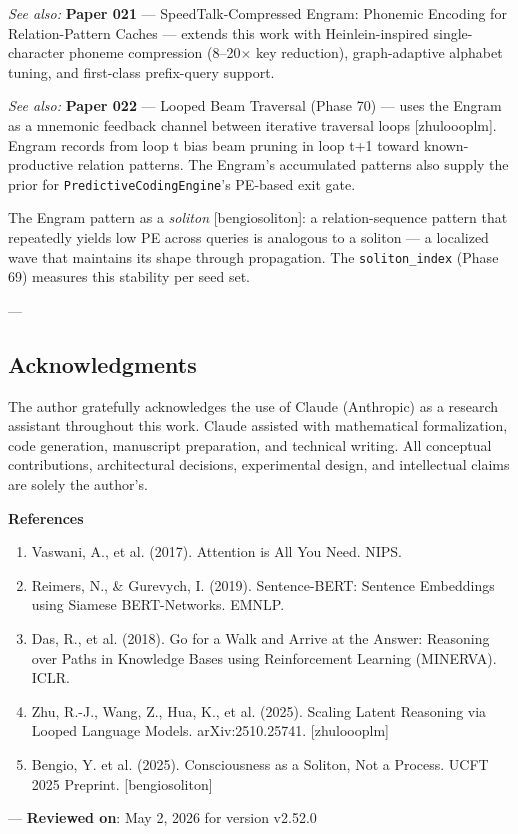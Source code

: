 \textit{See also:} \textbf{Paper 021} — SpeedTalk-Compressed Engram: Phonemic Encoding for Relation-Pattern Caches — extends this work with Heinlein-inspired single-character phoneme compression (8–20$\times$ key reduction), graph-adaptive alphabet tuning, and first-class prefix-query support.

\textit{See also:} \textbf{Paper 022} — Looped Beam Traversal (Phase 70) — uses the Engram as a mnemonic feedback channel between iterative traversal loops [zhu\-loooplm]. Engram records from loop t bias beam pruning in loop t+1 toward known-productive relation patterns. The Engram's accumulated patterns also supply the prior for \texttt{PredictiveCodingEngine}'s PE-based exit gate.

The Engram pattern as a \textit{soliton} [bengio\-soliton]: a relation-sequence pattern that repeatedly yields low PE across queries is analogous to a soliton — a localized wave that maintains its shape through propagation. The \texttt{soliton\_index} (Phase 69) measures this stability per seed set.

---
\subsection{Acknow\-ledgments}

The author gratefully ackno\-wledges the use of Claude (Anthropic) as a research assistant throughout this work. Claude assisted with mathe\-matical forma\-lization, code generation, manuscript preparation, and technical writing. All conceptual contr\-ibutions, archi\-tectural decisions, exper\-imental design, and intel\-lectual claims are solely the author's.

\textbf{References}
\begin{enumerate}
\item Vaswani, A., et al. (2017). Attention is All You Need. NIPS.
\item Reimers, N., \& Gurevych, I. (2019). Sentence-BERT: Sentence Embeddings using Siamese BERT-Networks. EMNLP.
\item Das, R., et al. (2018). Go for a Walk and Arrive at the Answer: Reasoning over Paths in Knowledge Bases using Reinfo\-rcement Learning (MINERVA). ICLR.
\item Zhu, R.-J., Wang, Z., Hua, K., et al. (2025). Scaling Latent Reasoning via Looped Language Models. arXiv:2510.25741. [zhu\-loooplm]
\item Bengio, Y. et al. (2025). Consci\-ousness as a Soliton, Not a Process. UCFT 2025 Preprint. [bengio\-soliton]

\end{enumerate}
---
\textbf{Reviewed on}: May 2, 2026 for version v2.52.0
